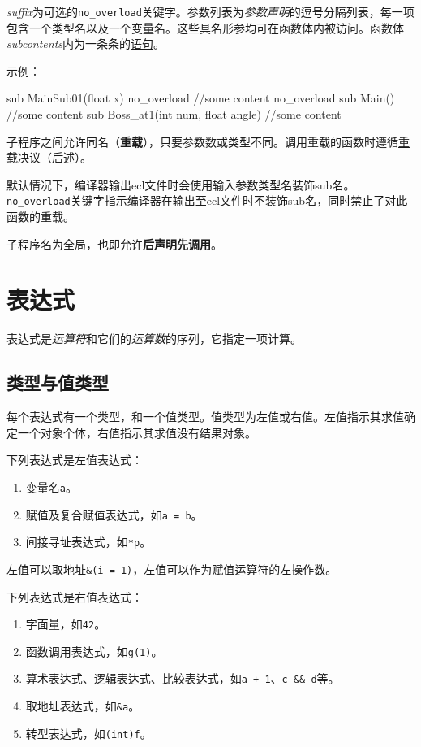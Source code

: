 \documentclass[UTF8]{ctexart}
\begin{document}
\textit{suffix}为可选的\verb|no_overload|关键字。参数列表为\textit{参数声明}的逗号分隔列表，每一项包含一个类型名以及一个变量名。这些具名形参均可在函数体内被访问。函数体\textit{subcontents}内为一条条的\hyperref[yuju]{语句}。

示例：

\begin{MUAvbt}
sub MainSub01(float x) no_overload
{
	//some content
}
no_overload sub Main()
{
	//some content
}
sub Boss_at1(int num, float angle) {
	//some content
}
\end{MUAvbt}

子程序之间允许同名（\textbf{重载}），只要参数数或类型不同。调用重载的函数时遵循\hyperref[chongzai]{重载决议}（后述）。

默认情况下，编译器输出ecl文件时会使用输入参数类型名装饰sub名。\verb|no_overload|关键字指示编译器在输出至ecl文件时不装饰sub名，同时禁止了对此函数的重载。

子程序名为全局，也即允许\textbf{后声明先调用}。

\section{表达式}

表达式是\textit{运算符}和它们的\textit{运算数}的序列，它指定一项计算。

\subsection{类型与值类型}

每个表达式有一个类型，和一个值类型。值类型为左值或右值。左值指示其求值确定一个对象个体，右值指示其求值没有结果对象。

下列表达式是左值表达式：
\begin{enumerate}
	\item 变量名\verb|a|。
	\item 赋值及复合赋值表达式，如\verb|a = b|。
	\item 间接寻址表达式，如\verb|*p|。
\end{enumerate}

左值可以取地址\verb|&(i = 1)|，左值可以作为赋值运算符的左操作数。

下列表达式是右值表达式：
\begin{enumerate}
	\item 字面量，如\verb|42|。
	\item 函数调用表达式，如\verb|g(1)|。
	\item 算术表达式、逻辑表达式、比较表达式，如\verb|a + 1|、\verb|c && d|等。
	\item 取地址表达式，如\verb|&a|。
	\item 转型表达式，如\verb|(int)f|。
\end{enumerate}
\end{document}
